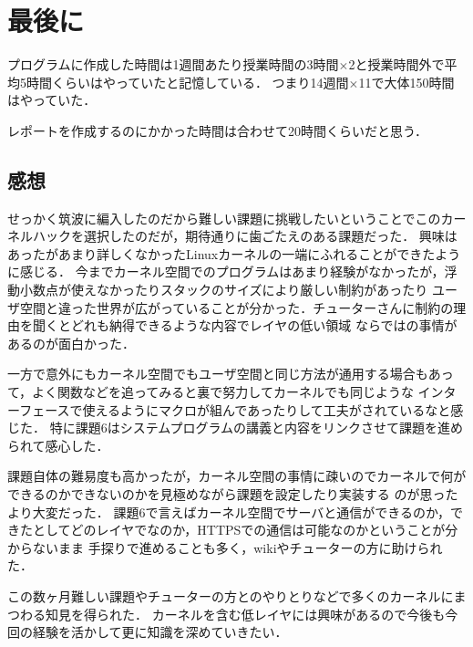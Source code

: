 \chapter{最後に}
プログラムに作成した時間は1週間あたり授業時間の3時間$\times$2と授業時間外で平均5時間くらいはやっていたと記憶している．
つまり14週間$\times$11で大体150時間はやっていた．

レポートを作成するのにかかった時間は合わせて20時間くらいだと思う．

\section{感想}
せっかく筑波に編入したのだから難しい課題に挑戦したいということでこのカーネルハックを選択したのだが，期待通りに歯ごたえのある課題だった．
興味はあったがあまり詳しくなかったLinuxカーネルの一端にふれることができたように感じる．
今までカーネル空間でのプログラムはあまり経験がなかったが，浮動小数点が使えなかったりスタックのサイズにより厳しい制約があったり
ユーザ空間と違った世界が広がっていることが分かった．チューターさんに制約の理由を聞くとどれも納得できるような内容でレイヤの低い領域
ならではの事情があるのが面白かった．

一方で意外にもカーネル空間でもユーザ空間と同じ方法が通用する場合もあって，よく関数などを追ってみると裏で努力してカーネルでも同じような
インターフェースで使えるようにマクロが組んであったりして工夫がされているなと感じた．
特に課題6はシステムプログラムの講義と内容をリンクさせて課題を進められて感心した．

課題自体の難易度も高かったが，カーネル空間の事情に疎いのでカーネルで何ができるのかできないのかを見極めながら課題を設定したり実装する
のが思ったより大変だった．
課題6で言えばカーネル空間でサーバと通信ができるのか，できたとしてどのレイヤでなのか，HTTPSでの通信は可能なのかということが分からないまま
手探りで進めることも多く，wikiやチューターの方に助けられた．

この数ヶ月難しい課題やチューターの方とのやりとりなどで多くのカーネルにまつわる知見を得られた．
カーネルを含む低レイヤには興味があるので今後も今回の経験を活かして更に知識を深めていきたい．
